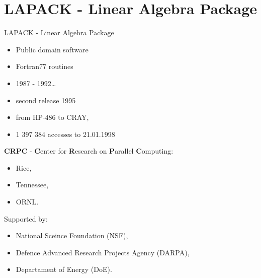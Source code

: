 \section{LAPACK - Linear Algebra Package}
	\begin{frame}{LAPACK - Linear Algebra Package}
		\begin{itemize}
			\item Public domain software
			\item Fortran77 routines
			\item 1987 - 1992\dots
			\item second release 1995
			\item from HP-486 to CRAY,
			\item 1 397 384 accesses to 21.01.1998
		\end{itemize}
		\textbf{CRPC} - \textbf{C}enter for \textbf{R}esearch on \textbf{P}arallel \textbf{C}omputing: 
		\begin{itemize}
			\item Rice,
			\item Tennessee,
			\item ORNL.
		\end{itemize}
		Supported by:
		\begin{itemize}
			\item National Sceince Foundation (NSF),
			\item Defence Advanced Research Projects Agency (DARPA),
			\item Departament of Energy (DoE).
		\end{itemize}
	\end{frame}
